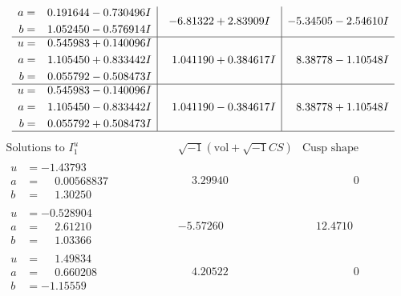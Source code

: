 \documentclass[1p]{elsarticle_modified}
\theoremstyle{definition}
\newcommand{\I}{\sqrt{-1}}
\begin{document}
$$\begin{array}{c|c|c}
\begin{aligned}
a &= \phantom{-}0.191644 - 0.730496 I \\
b &= \phantom{-}1.052450 - 0.576914 I\end{aligned}
 & -6.81322 + 2.83909 I & -5.34505 - 2.54610 I \\ \hline\begin{aligned}
u &= \phantom{-}0.545983 + 0.140096 I \\
a &= \phantom{-}1.105450 + 0.833442 I \\
b &= \phantom{-}0.055792 - 0.508473 I\end{aligned}
 & \phantom{-}1.041190 + 0.384617 I & \phantom{-}8.38778 - 1.10548 I \\ \hline\begin{aligned}
u &= \phantom{-}0.545983 - 0.140096 I \\
a &= \phantom{-}1.105450 - 0.833442 I \\
b &= \phantom{-}0.055792 + 0.508473 I\end{aligned}
 & \phantom{-}1.041190 - 0.384617 I & \phantom{-}8.38778 + 1.10548 I\\
 \hline 
 \end{array}$$\newpage$$\begin{array}{c|c|c}  
\text{Solutions to }I^u_{1}& \I (\text{vol} + \sqrt{-1}CS) & \text{Cusp shape}\\
 \hline 
\begin{aligned}
u &= -1.43793\phantom{ +0.000000I} \\
a &= \phantom{-}0.00568837\phantom{ +0.000000I} \\
b &= \phantom{-}1.30250\phantom{ +0.000000I}\end{aligned}
 & \phantom{-}3.29940\phantom{ +0.000000I} & \phantom{-0.000000 } 0 \\ \hline\begin{aligned}
u &= -0.528904\phantom{ +0.000000I} \\
a &= \phantom{-}2.61210\phantom{ +0.000000I} \\
b &= \phantom{-}1.03366\phantom{ +0.000000I}\end{aligned}
 & -5.57260\phantom{ +0.000000I} & \phantom{-}12.4710\phantom{ +0.000000I} \\ \hline\begin{aligned}
u &= \phantom{-}1.49834\phantom{ +0.000000I} \\
a &= \phantom{-}0.660208\phantom{ +0.000000I} \\
b &= -1.15559\phantom{ +0.000000I}\end{aligned}
 & \phantom{-}4.20522\phantom{ +0.000000I} & \phantom{-0.000000 } 0 \\ \hline\begin{aligned}

\end{aligned}
\end{array}$$
\end{document}
